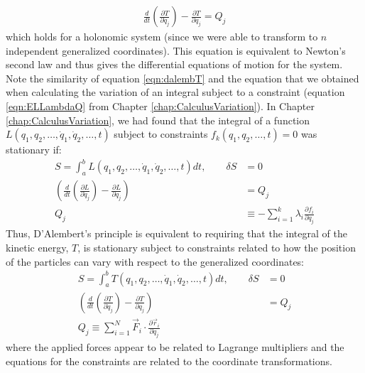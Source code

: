\begin{align}
\frac{d}{dt}\left(\frac{\partial T}{\partial \dot{q}_j} \right) - \frac{\partial T}{\partial q_j}=Q_j
\label{eqn:dalembT}
\end{align}
which holds for a holonomic system (since we were able to transform to $n$ independent generalized coordinates). This equation is equivalent to Newton's second law and thus gives the differential equations of motion for the system. Note the similarity of equation \ref{eqn:dalembT} and the equation that we obtained when calculating the variation of an integral subject to a constraint (equation \ref{eqn:ELLambdaQ} from Chapter \ref{chap:CalculusVariation}). In Chapter \ref{chap:CalculusVariation}, we had found that the integral of a function $L(q_1,q_2,\dots,\dot{q}_1, \dot{q}_2,\dots,t)$ subject to constraints $f_k(q_1,q_2,\dots ,t)=0$ was stationary if:
\begin{align}
S=\int_a^b L(q_1,q_2,\dots,\dot{q}_1, \dot{q}_2,\dots,t)dt,\qquad \delta S&=0\nonumber\\
\left(\frac{d}{dt}\left(\frac{\partial L}{\partial \dot{q}_j}\right)-\frac{\partial L}{\partial q_j}\right) &=Q_j\nonumber\\
Q_j&\equiv -\sum_{i=1}^k\lambda_i \frac{\partial f_i}{\partial q_j}
\end{align}
Thus, D'Alembert's principle is equivalent to requiring that the integral of the kinetic energy, $T$, is stationary subject to constraints related to how the position of the particles can vary with respect to the generalized coordinates:
\begin{align}
S=\int_a^b T(q_1,q_2,\dots,\dot{q}_1, \dot{q}_2,\dots,t)dt,\qquad \delta S&=0\nonumber\\
\left(\frac{d}{dt}\left(\frac{\partial T}{\partial \dot{q}_j}\right)-\frac{\partial T}{\partial q_j}\right) &=Q_j\nonumber\\
 Q_j\equiv \sum_{i=1}^N\vec{F}_i\cdot\frac{\partial\vec{r}_i}{\partial q_j}
\end{align}
where the applied forces appear to be related to Lagrange multipliers and the equations for the constraints are related to the coordinate transformations.

